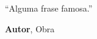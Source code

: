 %
%
\thispagestyle{empty}
\begin{epigrafe}
\begin{em}
``Alguma frase famosa.''
\newline
\newline
\end{em}
\begin{autorepigrafe}
\textbf{Autor}, Obra
\end{autorepigrafe}

\end{epigrafe}


